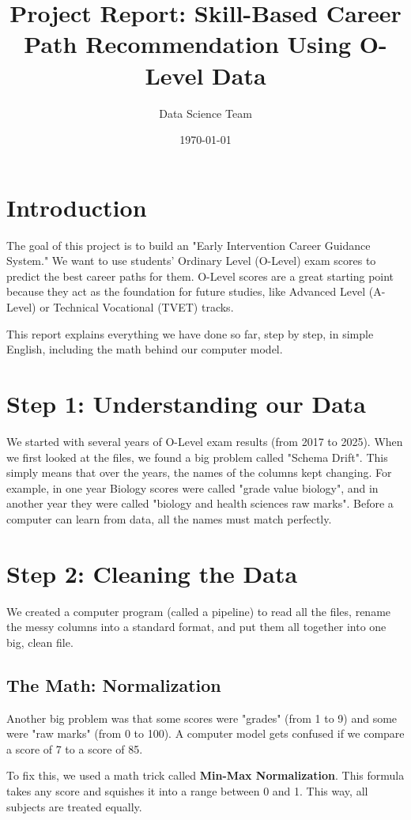 \documentclass[12pt]{article}
\title{Project Report: Skill-Based Career Path Recommendation Using O-Level Data}
\author{Data Science Team}
\date{\today}
\begin{document}
\maketitle

\section{Introduction}
The goal of this project is to build an "Early Intervention Career Guidance System." We want to use students' Ordinary Level (O-Level) exam scores to predict the best career paths for them. O-Level scores are a great starting point because they act as the foundation for future studies, like Advanced Level (A-Level) or Technical Vocational (TVET) tracks.

This report explains everything we have done so far, step by step, in simple English, including the math behind our computer model.

\section{Step 1: Understanding our Data}
We started with several years of O-Level exam results (from 2017 to 2025). When we first looked at the files, we found a big problem called "Schema Drift". This simply means that over the years, the names of the columns kept changing. For example, in one year Biology scores were called "grade value biology", and in another year they were called "biology and health sciences raw marks". Before a computer can learn from data, all the names must match perfectly.

\section{Step 2: Cleaning the Data}
We created a computer program (called a pipeline) to read all the files, rename the messy columns into a standard format, and put them all together into one big, clean file.

\subsection{The Math: Normalization}
Another big problem was that some scores were "grades" (from 1 to 9) and some were "raw marks" (from 0 to 100). A computer model gets confused if we compare a score of 7 to a score of 85. 

To fix this, we used a math trick called \textbf{Min-Max Normalization}. This formula takes any score and squishes it into a range between 0 and 1. This way, all subjects are treated equally.
\end{document}

